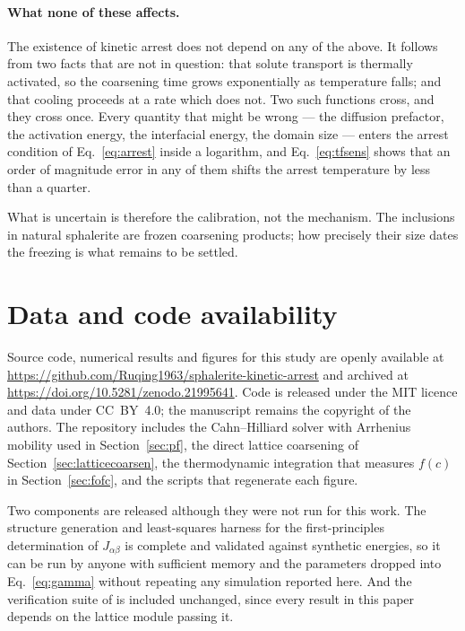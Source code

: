 \documentclass[11pt,a4paper]{article}
\begin{document}
\paragraph{What none of these affects.} The existence of kinetic arrest does not
depend on any of the above. It follows from two facts that are not in question:
that solute transport is thermally activated, so the coarsening time grows
exponentially as temperature falls; and that cooling proceeds at a rate which
does not. Two such functions cross, and they cross once. Every quantity that
might be wrong --- the diffusion prefactor, the activation energy, the
interfacial energy, the domain size --- enters the arrest condition of
Eq.~\eqref{eq:arrest} inside a logarithm, and Eq.~\eqref{eq:tfsens} shows that
an order of magnitude error in any of them shifts the arrest temperature by less
than a quarter.

What is uncertain is therefore the calibration, not the mechanism. The
inclusions in natural sphalerite are frozen coarsening products; how precisely
their size dates the freezing is what remains to be settled.

\section*{Data and code availability}
\label{sec:availability}
Source code, numerical results and figures for this study are openly available
at \url{https://github.com/Ruqing1963/sphalerite-kinetic-arrest} and
archived at \url{https://doi.org/10.5281/zenodo.21995641}. Code is
released under the MIT licence and data under CC~BY~4.0; the manuscript remains
the copyright of the authors. The repository includes the Cahn--Hilliard solver
with Arrhenius mobility used in Section~\ref{sec:pf}, the direct lattice
coarsening of Section~\ref{sec:latticecoarsen}, the thermodynamic integration
that measures $f(c)$ in Section~\ref{sec:fofc}, and the scripts that regenerate
each figure.

Two components are released although they were not run for this work. The
structure generation and least-squares harness for the first-principles
determination of $J_{\alpha\beta}$ is complete and validated against synthetic
energies, so it can be run by anyone with sufficient memory and the parameters
dropped into Eq.~\eqref{eq:gamma} without repeating any simulation reported
here. And the verification suite of \citet{yu2026} is included unchanged, since
every result in this paper depends on the lattice module passing it.
\end{document}
